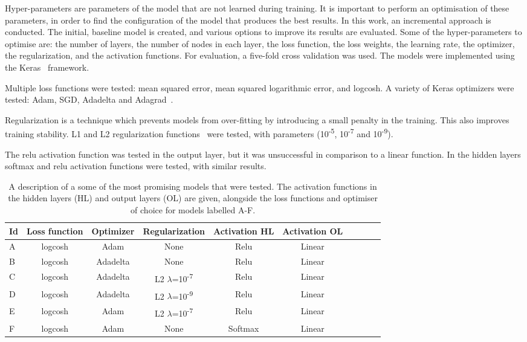 \documentclass[10pt, paper=a4, UKenglish]{article}
\begin{document}
Hyper-parameters are parameters of the model that are not learned during training. It is important to perform an optimisation of these parameters, in order to find the configuration of the model that produces the best results. In this work, an incremental approach is conducted. The initial, baseline model is created, and various options to improve its results are evaluated. Some of the hyper-parameters to optimise are: the number of layers, the number of nodes in each layer, the loss function, the loss weights, the learning rate, the optimizer, the regularization, and the activation functions. For evaluation, a five-fold cross validation was used. The models were implemented using the Keras~\cite{keras} framework.

Multiple loss functions were tested: mean squared error, mean squared logarithmic error, and logcosh. A variety of Keras optimizers were tested: Adam, SGD, Adadelta and Adagrad~\cite{optimizers_overview}.

Regularization is a technique which prevents models from over-fitting by introducing a small penalty in the training. This also improves training stability. L1 and L2 regularization functions~\cite{andrewng_reg} were tested, with parameters (10\textsuperscript{-5}, 10\textsuperscript{-7} and 10\textsuperscript{-9}).

The relu activation function was tested in the output layer, but it was unsuccessful in comparison to a linear function. In the hidden layers softmax and relu activation functions were tested, with similar results.

\begin{table}[!htb]
\setlength{\belowcaptionskip}{-10pt}
  \begin{center}
    \begin{tabular}{|>{\centering\arraybackslash}p{0.4cm}|c|c|c|c|c|c|c|c|c|}
      \hline
      Id & Loss function & Optimizer & Regularization & Activation HL & Activation OL \\
      \hline
      A & logcosh & Adam & None & Relu & Linear \\
      \hline
      B & logcosh & Adadelta & None & Relu & Linear \\
      \hline
      C & logcosh & Adadelta & L2 $\lambda$=10\textsuperscript{-7} & Relu & Linear \\
      \hline
      D & logcosh & Adadelta & L2 $\lambda$=10\textsuperscript{-9} & Relu & Linear \\
      \hline
      E & logcosh & Adam & L2 $\lambda$=10\textsuperscript{-7} & Relu & Linear \\
      \hline
      F & logcosh & Adam & None & Softmax & Linear \\
      \hline
    \end{tabular}
    \caption{A description of a some of the most promising models that were tested. The activation functions in the hidden layers (HL) and output layers (OL) are given, alongside the loss functions and optimiser of choice for models labelled A-F.}
    \label{tab:model_settings}
  \end{center}
\end{table}
\end{document}
